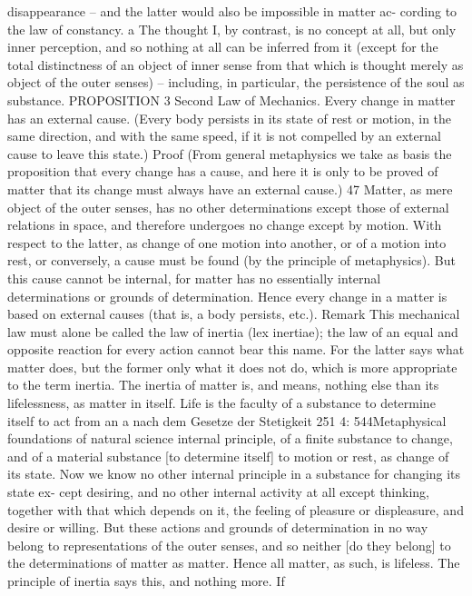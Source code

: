 disappearance – and the latter would also be impossible in matter ac-
cording to the law of constancy. a The thought I, by contrast, is no concept
at all, but only inner perception, and so nothing at all can be inferred
from it (except for the total distinctness of an object of inner sense from
that which is thought merely as object of the outer senses) – including,
in particular, the persistence of the soul as substance.
PROPOSITION 3
Second Law of Mechanics. Every change in matter has an external cause.
(Every body persists in its state of rest or motion, in the same direction,
and with the same speed, if it is not compelled by an external cause to
leave this state.)
Proof
(From general metaphysics we take as basis the proposition that every
change has a cause, and here it is only to be proved of matter that its
change must always have an external cause.) 47 Matter, as mere object of
the outer senses, has no other determinations except those of external
relations in space, and therefore undergoes no change except by motion.
With respect to the latter, as change of one motion into another, or of a
motion into rest, or conversely, a cause must be found (by the principle
of metaphysics). But this cause cannot be internal, for matter has no
essentially internal determinations or grounds of determination. Hence
every change in a matter is based on external causes (that is, a body
persists, etc.).
Remark
This mechanical law must alone be called the law of inertia (lex inertiae);
the law of an equal and opposite reaction for every action cannot bear
this name. For the latter says what matter does, but the former only
what it does not do, which is more appropriate to the term inertia. The
inertia of matter is, and means, nothing else than its lifelessness, as matter
in itself. Life is the faculty of a substance to determine itself to act from an
a
nach dem Gesetze der Stetigkeit
251
4: 544Metaphysical foundations of natural science
internal principle, of a ﬁnite substance to change, and of a material substance
[to determine itself] to motion or rest, as change of its state. Now we
know no other internal principle in a substance for changing its state ex-
cept desiring, and no other internal activity at all except thinking, together
with that which depends on it, the feeling of pleasure or displeasure, and
desire or willing. But these actions and grounds of determination in no
way belong to representations of the outer senses, and so neither [do they
belong] to the determinations of matter as matter. Hence all matter, as
such, is lifeless. The principle of inertia says this, and nothing more. If
